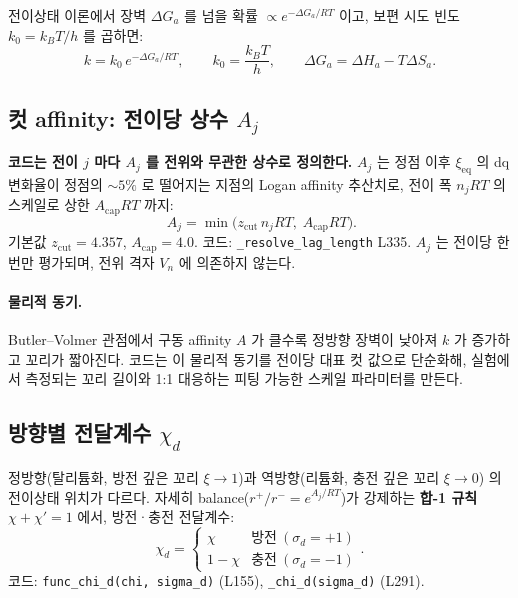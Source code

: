 \documentclass[11pt,a4paper]{article}
\newcommand{\eq}{\mathrm{eq}}
\begin{document}
전이상태 이론에서 장벽 $\Delta G_a$ 를 넘을 확률 $\propto e^{-\Delta G_a/RT}$ 이고,
보편 시도 빈도 $k_0 = k_BT/h$ 를 곱하면:
\begin{equation}
k = k_0\,e^{-\Delta G_a/RT},\qquad k_0=\frac{k_BT}{h},\qquad
\Delta G_a = \Delta H_a - T\Delta S_a.
\label{eq:eyring}
\end{equation}

\subsection{컷 affinity: 전이당 상수 $A_j$}

\textbf{코드는 전이 $j$ 마다 $A_j$ 를 전위와 무관한 상수로 정의한다.}
$A_j$ 는 정점 이후 $\xi_\eq$ 의 dq 변화율이 정점의 $\sim5\%$ 로 떨어지는 지점의
Logan affinity 추산치로, 전이 폭 $n_j RT$ 의 스케일로 상한 $A_\mathrm{cap} RT$ 까지:
\begin{equation}
\boxed{\;A_j = \min\!\bigl(z_\mathrm{cut}\,n_j RT,\;A_\mathrm{cap} RT\bigr).}
\label{eq:Aj}
\end{equation}
기본값 $z_\mathrm{cut}=4.357$, $A_\mathrm{cap}=4.0$. 코드: \texttt{\_resolve\_lag\_length} L335.
$A_j$ 는 전이당 한 번만 평가되며, 전위 격자 $V_n$ 에 의존하지 않는다.

\paragraph{물리적 동기.}
Butler--Volmer 관점에서 구동 affinity $A$ 가 클수록 정방향 장벽이 낮아져 $k$ 가 증가하고
꼬리가 짧아진다. 코드는 이 물리적 동기를 전이당 대표 컷 값으로 단순화해, 실험에서 측정되는
꼬리 길이와 1:1 대응하는 피팅 가능한 스케일 파라미터를 만든다.

\subsection{방향별 전달계수 $\chi_d$}

정방향(탈리튬화, 방전 깊은 꼬리 $\xi\to1$)과 역방향(리튬화, 충전 깊은 꼬리 $\xi\to0$)
의 전이상태 위치가 다르다. 자세히 balance($r^+/r^- = e^{A_j/RT}$)가 강제하는
\textbf{합-1 규칙} $\chi + \chi' = 1$ 에서, 방전·충전 전달계수:
\begin{equation}
\chi_d = \begin{cases} \chi & \text{방전}\ (\sigma_d=+1) \\ 1-\chi & \text{충전}\ (\sigma_d=-1) \end{cases}.
\label{eq:chid}
\end{equation}
코드: \texttt{func\_chi\_d(chi, sigma\_d)} (L155), \texttt{\_chi\_d(sigma\_d)} (L291).
\end{document}
